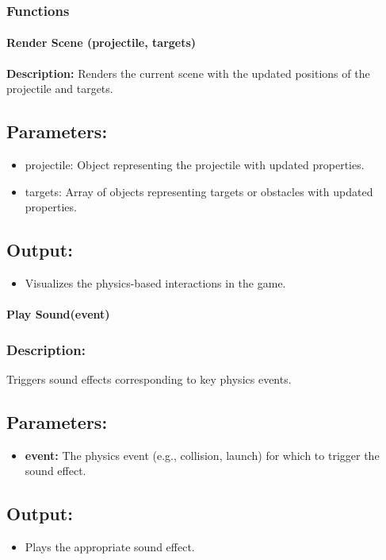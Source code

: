 \documentclass[12pt, titlepage]{article}
\begin{document}
\subsubsection{Functions}
\paragraph{Render Scene (projectile, targets)}
\textbf{Description:} Renders the current scene with the updated positions of the projectile and targets.

\subsection*{Parameters:}
\begin{itemize}
  \item projectile: Object representing the projectile with updated properties.
  \item targets: Array of objects representing targets or obstacles with updated properties.
\end{itemize}

\subsection*{Output:}
\begin{itemize}
  \item Visualizes the physics-based interactions in the game.
\end{itemize}

\paragraph{Play Sound(event)}
\subsubsection{Description:} Triggers sound effects corresponding to key physics events.

\subsection*{Parameters:}

\begin{itemize}
  \item \textbf{event:} The physics event (e.g., collision, launch) for which to trigger the sound effect.
\end{itemize}

\subsection*{Output:}
\begin{itemize}
  \item Plays the appropriate sound effect.
\end{itemize}
\end{document}

